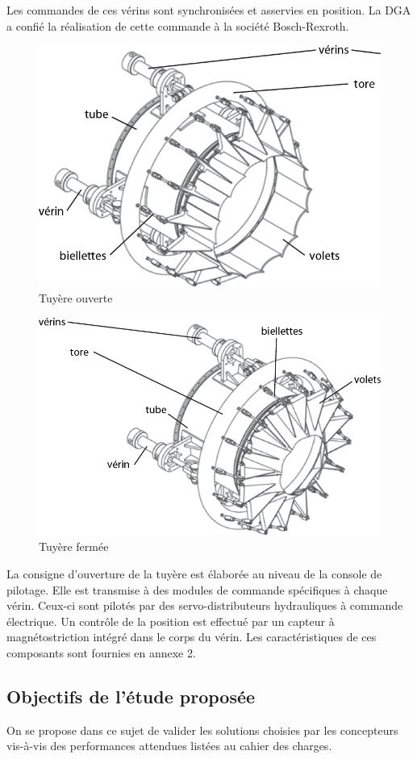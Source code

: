 \documentclass[10pt,fleqn]{article} %
\begin{document}
\begin{multicols}{2}
Les commandes de ces vérins sont synchronisées et asservies en position. La DGA a confié la réalisation de cette commande à la société Bosch-Rexroth.


\begin{figure}[H]
\centering
\includegraphics[width=.8\linewidth]{doc_04}
\caption{\label{doc_04}Tuyère ouverte}
\end{figure}

\begin{figure}[H]
\centering
\includegraphics[width=.8\linewidth]{doc_05}
\caption{\label{doc_05} Tuyère fermée}
\end{figure}

	La consigne d'ouverture de la tuyère est élaborée au niveau de la console de pilotage. Elle est transmise à des modules de commande spécifiques à chaque vérin. Ceux-ci sont pilotés par des servo-distributeurs hydrauliques à commande électrique. Un contrôle de la position est effectué par un capteur à magnétostriction intégré dans le corps du vérin. Les caractéristiques de ces composants sont fournies en annexe 2.
	
\subsection*{Objectifs de l'étude proposée}
		On se propose dans ce sujet de valider les solutions choisies par les concepteurs vis-à-vis des performances attendues listées au cahier des charges.
		
\end{multicols}
\end{document}
